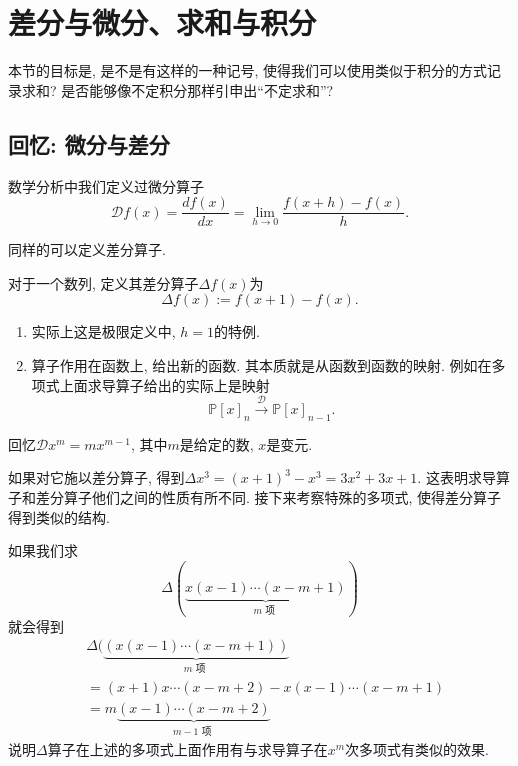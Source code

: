 \documentclass{ctexart}
\begin{document}
\newpage
\section{差分与微分、求和与积分}

本节的目标是, 是不是有这样的一种记号, 使得我们可以使用类似于积分的方式记录求和? 是否能够像不定积分那样引申出``不定求和''?

\subsection{回忆: 微分与差分} 数学分析中我们定义过微分算子
$$
	\mathscr D f(x)=\frac{d f(x)}{d x}=\lim _{h \rightarrow 0} \frac{f(x+h)-f(x)}{h} .
$$

同样的可以定义差分算子.

\begin{definition}[差分] 对于一个数列, 定义其差分算子$\Delta f(x)$为
	\[
		\Delta f(x):=f(x+1)-f(x) .
	\]
\end{definition}

\begin{remark}
	\begin{enumerate}
		\item 实际上这是极限定义中, $h=1$的特例.
		\item 算子作用在函数上, 给出新的函数. 其本质就是从函数到函数的映射. 例如在多项式上面求导算子给出的实际上是映射
		      \[
			      \mathbb P [x]_n\stackrel{\mathscr D}{\longrightarrow} \mathbb P[x]_{n-1}.
		      \]
	\end{enumerate}

\end{remark}

\begin{example}
	回忆$\mathscr D x^m=m x^{m-1}$, 其中$m$是给定的数, $x$是变元.

	如果对它施以差分算子, 得到$\Delta x^3=(x+1)^3-x^3=3 x^2+3 x+1$. 这表明求导算子和差分算子他们之间的性质有所不同.
	接下来考察特殊的多项式, 使得差分算子得到类似的结构.

\end{example}

\begin{example}[下降幂]
	如果我们求
	$$
		\Delta (\underbrace{x(x-1) \cdots(x-m+1)}_{m \text { 项 }})
	$$
	就会得到
	$$
		\begin{aligned}
			 & \Delta(\underbrace{(x(x-1) \cdots(x-m+1))}_{m \text { 项 }} \\
			 & =(x+1) x \cdots(x-m+2)-x(x-1) \cdots(x-m+1)                \\
			 & =m\underbrace{(x-1) \cdots(x-m+2)}_{m-1 \text { 项 }}
		\end{aligned}
	$$
	说明$\Delta$算子在上述的多项式上面作用有与求导算子在$x^m$次多项式有类似的效果.
\end{example}
\end{document}
